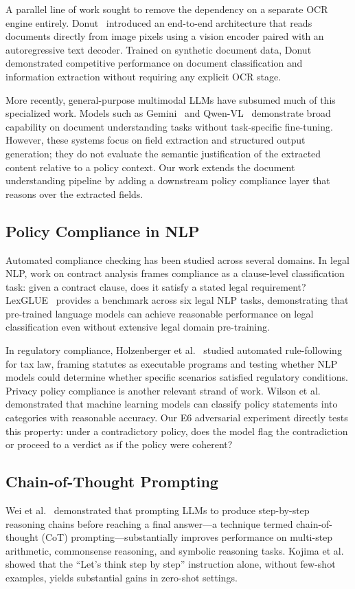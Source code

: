 \documentclass[11pt,a4paper]{article}
\begin{document}
A parallel line of work sought to remove the dependency on a separate OCR engine entirely. Donut~\cite{kim2022ocr} introduced an end-to-end architecture that reads documents directly from image pixels using a vision encoder paired with an autoregressive text decoder. Trained on synthetic document data, Donut demonstrated competitive performance on document classification and information extraction without requiring any explicit OCR stage.

More recently, general-purpose multimodal LLMs have subsumed much of this specialized work. Models such as Gemini~\cite{kadavath2022language} and Qwen-VL~\cite{bai2023qwenvl} demonstrate broad capability on document understanding tasks without task-specific fine-tuning. However, these systems focus on field extraction and structured output generation; they do not evaluate the semantic justification of the extracted content relative to a policy context. Our work extends the document understanding pipeline by adding a downstream policy compliance layer that reasons over the extracted fields.

\subsection{Policy Compliance in NLP}
Automated compliance checking has been studied across several domains. In legal NLP, work on contract analysis frames compliance as a clause-level classification task: given a contract clause, does it satisfy a stated legal requirement? LexGLUE~\cite{chalkidis2022lexglue} provides a benchmark across six legal NLP tasks, demonstrating that pre-trained language models can achieve reasonable performance on legal classification even without extensive legal domain pre-training.

In regulatory compliance, Holzenberger et al.~\cite{holzenberger2020dataset} studied automated rule-following for tax law, framing statutes as executable programs and testing whether NLP models could determine whether specific scenarios satisfied regulatory conditions. Privacy policy compliance is another relevant strand of work. Wilson et al.~\cite{wilson2016creation} demonstrated that machine learning models can classify policy statements into categories with reasonable accuracy. Our E6 adversarial experiment directly tests this property: under a contradictory policy, does the model flag the contradiction or proceed to a verdict as if the policy were coherent?

\subsection{Chain-of-Thought Prompting}
Wei et al.~\cite{wei2022chain} demonstrated that prompting LLMs to produce step-by-step reasoning chains before reaching a final answer---a technique termed chain-of-thought (CoT) prompting---substantially improves performance on multi-step arithmetic, commonsense reasoning, and symbolic reasoning tasks. Kojima et al.~\cite{kojima2022large} showed that the ``Let's think step by step'' instruction alone, without few-shot examples, yields substantial gains in zero-shot settings.
\end{document}
